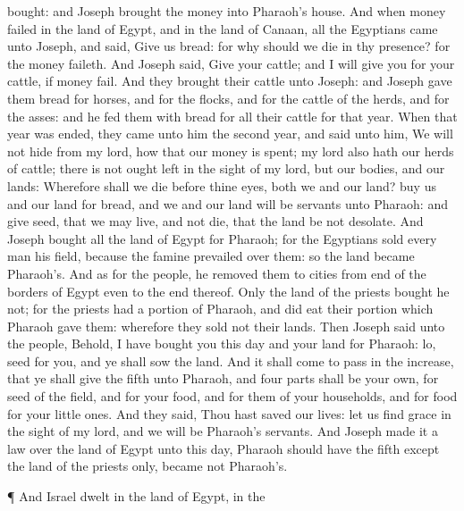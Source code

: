 {bought: and
Joseph
brought the
money into
Pharaoh’s
house.
And when
money
failed in the
land of
Egypt, and in the
land of
Canaan, all the
Egyptians
came unto
Joseph, and
said,
Give us
bread: for why should we
die in thy presence? for the
money
faileth.
And
Joseph
said,
Give your
cattle; and I will
give you for your
cattle, if
money
fail.
And they
brought their
cattle unto
Joseph: and
Joseph
gave them
bread
{} for
horses, and for the
flocks, and for the
cattle of the
herds, and for the
asses: and he
fed them with
bread for all their
cattle for that
year.
When that
year was
ended, they
came unto him the
second
year, and
said unto him, We will not
hide
{} from my
lord, how that our
money is
spent; my
lord also
hath our
herds of
cattle; there is not ought
left in the
sight of my
lord, but our
bodies, and our
lands:
Wherefore shall we
die before thine
eyes, both we and our
land?
buy us and our
land for
bread, and we and our
land will be
servants unto
Pharaoh: and
give
{}
seed, that we may
live, and not
die, that the
land be not
desolate.
And
Joseph
bought all the
land of
Egypt for
Pharaoh; for the
Egyptians
sold every
man his
field, because the
famine
prevailed over them: so the
land became
Pharaoh’s.
And as for the
people, he
removed them to
cities from
{}
end of the
borders of
Egypt even to the
{}
end thereof.
Only the
land of the
priests bought
he not; for the
priests had a
portion
{} of
Pharaoh, and did
eat their
portion which
Pharaoh
gave them: wherefore they
sold not their
lands.
Then
Joseph
said unto the
people, Behold, I have
bought you this
day and your
land for
Pharaoh:
lo,
{}
seed for you, and ye shall
sow the
land.
And it shall come to pass in the
increase, that ye shall
give the
fifth
{} unto
Pharaoh, and
four
parts shall be your own, for
seed of the
field, and for your
food, and for them of your
households, and for
food for your little
ones.
And they
said, Thou hast saved our
lives: let us
find
grace in the
sight of my
lord, and we will be
Pharaoh’s
servants.
And
Joseph
made it a
law over the
land of
Egypt unto this
day,
{}
Pharaoh should have the
fifth
{}
except the
land of the
priests only,
{} became not
Pharaoh’s.
\par }{\PP {}¶ And
Israel
dwelt in the
land of
Egypt, in the
}
